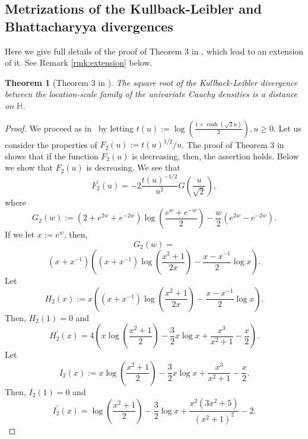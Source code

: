 \documentclass[journal]{IEEEtran}
\newtheorem{theorem}{Theorem}
\begin{document}
\subsection{Metrizations of the Kullback-Leibler and Bhattacharyya divergences}

Here we give full details of the proof of Theorem 3 in \cite{CauchyVoronoi-2020}, which lead to an extension of it. 
See Remark \ref{rmk:extension} below. 

\begin{theorem}[Theorem 3 in \cite{CauchyVoronoi-2020}]\label{thm:metrization-KLD}
The square root of the Kullback-Leibler divergence between the location-scale family of the univariate Cauchy densities is a distance on $\mathbb H$. 
\end{theorem}

\begin{proof}

We proceed as in~\cite{CauchyVoronoi-2020} by letting 
$t(u) := \log\left( \frac{1+\cosh(\sqrt{2} u)}{2} \right), u \geq 0. $
Let us consider the properties of $F_2(u) := t(u)^{1/2}/u$. 
The proof of Theorem 3 in ~\cite{CauchyVoronoi-2020} shows that if the function $F_2 (u)$ is decreasing, then, the assertion holds. 
Below we show that $F_2 (u)$ is decreasing. 
We see that 
$$ 
F_2^{\prime}(u) = -2\frac{t(u)^{-1/2}}{u^2} G\left(\frac{u}{\sqrt{2}}\right),
$$
where 
$$ G_2 (w) := (2+e^{2w} + e^{-2w}) \log\left( \frac{e^w + e^{-w}}{2}  \right) - \frac{w}{2} (e^{2w} - e^{-2w}). $$
If we let $x := e^w$, then, 
$$ G_2 (w) = $$
$$(x +x^{-1}) \left( (x +x^{-1}) \log \left(\frac{x^2 +1}{2x} \right) - \frac{x - x^{-1}}{2} \log x \right).
$$
Let 
$$ H_2 (x) := x \left( (x +x^{-1}) \log \left(\frac{x^2 +1}{2x} \right) - \frac{x - x^{-1}}{2} \log x \right).
$$
Then, $H_2 (1) = 0$ and 
$$
H_2^{\prime}(x) = 4\left( x \log \left(\frac{x^2 +1}{2} \right) - \frac{3}{2} x \log x + \frac{x^3}{x^2 +1} - \frac{x}{2}   \right). 
$$
Let 
$$
I_2(x) := x \log \left(\frac{x^2 +1}{2} \right) - \frac{3}{2} x \log x + \frac{x^3}{x^2 +1} - \frac{x}{2}. 
$$
Then, 
$I_2(1) = 0$ and 
$$
I_2^{\prime}(x) = \log \left(\frac{x^2 +1}{2} \right) - \frac{3}{2} \log x + \frac{x^2 (3x^2 + 5)}{(x^2 +1)^2} - 2. 
$$


\end{proof}
\end{document}
